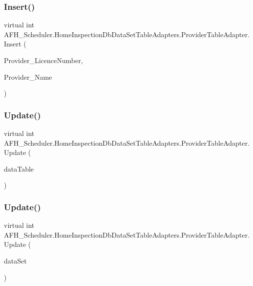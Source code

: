 \subsubsection{Insert()}
{\footnotesize\ttfamily virtual int A\+F\+H\+\_\+\+Scheduler.\+Home\+Inspection\+Db\+Data\+Set\+Table\+Adapters.\+Provider\+Table\+Adapter.\+Insert (\begin{DoxyParamCaption}\item[{string}]{Provider\+\_\+\+Licence\+Number,  }\item[{string}]{Provider\+\_\+\+Name }\end{DoxyParamCaption})\hspace{0.3cm}{\ttfamily [virtual]}}

\mbox{\label{class_a_f_h___scheduler_1_1_home_inspection_db_data_set_table_adapters_1_1_provider_table_adapter_a2ba48e11c20384d889034a6e8856df47}} 
\subsubsection{Update()\hspace{0.1cm}{\footnotesize\ttfamily [1/5]}}
{\footnotesize\ttfamily virtual int A\+F\+H\+\_\+\+Scheduler.\+Home\+Inspection\+Db\+Data\+Set\+Table\+Adapters.\+Provider\+Table\+Adapter.\+Update (\begin{DoxyParamCaption}\item[{\textbf{ Home\+Inspection\+Db\+Data\+Set.\+Provider\+Data\+Table}}]{data\+Table }\end{DoxyParamCaption})\hspace{0.3cm}{\ttfamily [virtual]}}

\mbox{\label{class_a_f_h___scheduler_1_1_home_inspection_db_data_set_table_adapters_1_1_provider_table_adapter_a2ab9d7e3854d9ee811401ffa2611b054}} 
\subsubsection{Update()\hspace{0.1cm}{\footnotesize\ttfamily [2/5]}}
{\footnotesize\ttfamily virtual int A\+F\+H\+\_\+\+Scheduler.\+Home\+Inspection\+Db\+Data\+Set\+Table\+Adapters.\+Provider\+Table\+Adapter.\+Update (\begin{DoxyParamCaption}\item[{\textbf{ Home\+Inspection\+Db\+Data\+Set}}]{data\+Set }\end{DoxyParamCaption})\hspace{0.3cm}{\ttfamily [virtual]}}

